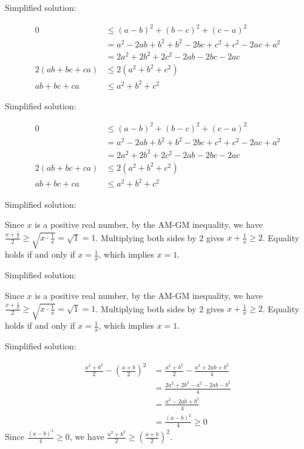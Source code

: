 \documentclass{article}
\begin{document}
Simplified solution:
\begin{tcolorbox}[colback=blue!10, width=\linewidth]
\begin{align*} 0 &\le (a-b)^2 + (b-c)^2 + (c-a)^2 \\ &= a^2 - 2ab + b^2 + b^2 - 2bc + c^2 + c^2 - 2ac + a^2 \\ &= 2a^2 + 2b^2 + 2c^2 - 2ab - 2bc - 2ac \\ 2(ab+bc+ca) &\le 2(a^2+b^2+c^2) \\ ab+bc+ca &\le a^2+b^2+c^2 \end{align*}
\end{tcolorbox}



Simplified solution:
\begin{tcolorbox}[colback=blue!10, width=\linewidth]
\begin{align*} 0 &\le (a-b)^2 + (b-c)^2 + (c-a)^2 \\ &= a^2 - 2ab + b^2 + b^2 - 2bc + c^2 + c^2 - 2ac + a^2 \\ &= 2a^2 + 2b^2 + 2c^2 - 2ab - 2bc - 2ac \\ 2(ab+bc+ca) &\le 2(a^2+b^2+c^2) \\ ab+bc+ca &\le a^2+b^2+c^2 \end{align*}
\end{tcolorbox}



Simplified solution:
\begin{tcolorbox}[colback=blue!10, width=\linewidth]
Since $x$ is a positive real number, by the AM-GM inequality, we have $\frac{x + \frac{1}{x}}{2} \ge \sqrt{x \cdot \frac{1}{x}} = \sqrt{1} = 1$. Multiplying both sides by 2 gives $x + \frac{1}{x} \ge 2$. Equality holds if and only if $x = \frac{1}{x}$, which implies $x = 1$.
\end{tcolorbox}



Simplified solution:
\begin{tcolorbox}[colback=blue!10, width=\linewidth]
Since $x$ is a positive real number, by the AM-GM inequality, we have $\frac{x + \frac{1}{x}}{2} \ge \sqrt{x \cdot \frac{1}{x}} = \sqrt{1} = 1$. Multiplying both sides by 2 gives $x + \frac{1}{x} \ge 2$. Equality holds if and only if $x = \frac{1}{x}$, which implies $x = 1$.
\end{tcolorbox}



Simplified solution:
\begin{tcolorbox}[colback=blue!10, width=\linewidth]
\begin{align*}
\frac{a^2+b^2}{2} - \left(\frac{a+b}{2}\right)^2 &= \frac{a^2+b^2}{2} - \frac{a^2+2ab+b^2}{4} \\
&= \frac{2a^2+2b^2 - a^2 - 2ab - b^2}{4} \\
&= \frac{a^2 - 2ab + b^2}{4} \\
&= \frac{(a-b)^2}{4} \geq 0
\end{align*} 
Since $\frac{(a-b)^2}{4} \ge 0$, we have $\frac{a^2+b^2}{2} \ge \left(\frac{a+b}{2}\right)^2$.
\end{tcolorbox}
\end{document}
